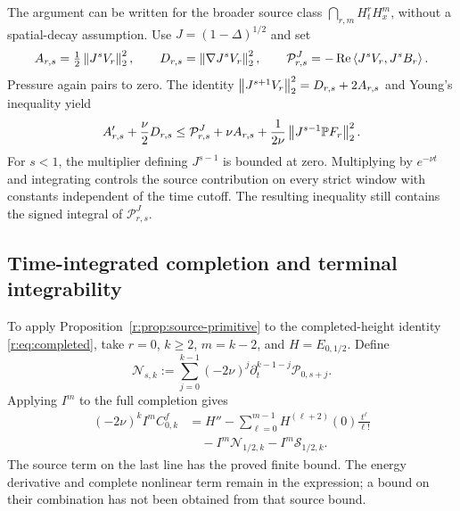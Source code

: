 The argument can be written for the broader source class
\(\bigcap_{r,m}H^r_tH^m_x\), without a spatial-decay assumption.
Use \(J=(1-\Delta)^{1/2}\) and set
\[
 A_{r,s}=\tfrac12\left\lVert J^sV_r\right\rVert_2^2,
 \qquad D_{r,s}=\left\lVert \nabla J^sV_r\right\rVert_2^2,
 \qquad
 \mathcal P^J_{r,s}=-\operatorname{Re}\left\langle J^sV_r,J^sB_r\right\rangle.
\]
Pressure again pairs to zero. The identity
\(\left\lVert J^{s+1}V_r\right\rVert_2^2=D_{r,s}+2A_{r,s}\)
and Young's inequality yield
\begin{equation}
 A'_{r,s}+\frac\nu2D_{r,s}
 \le\mathcal P^J_{r,s}+\nu A_{r,s}
       +\frac1{2\nu}\left\lVert J^{s-1}\mathbb P F_r\right\rVert_2^2.
 \label{r:eq:inhomogeneous-source-absorption}
\end{equation}
For \(s<1\), the multiplier defining \(J^{s-1}\) is bounded at
zero. Multiplying by \(e^{-\nu t}\) and integrating controls the
source contribution on every strict window with constants independent
of the time cutoff. The resulting inequality still contains the
signed integral of \(\mathcal P^J_{r,s}\).





\subsection{Time-integrated completion and terminal integrability}

To apply Proposition~\ref{r:prop:source-primitive} to the
completed-height identity \eqref{r:eq:completed}, take
\(r=0\), \(k\ge2\), \(m=k-2\), and \(H=E_{0,1/2}\). Define
\[
 \mathcal N_{s,k}:=\sum_{j=0}^{k-1}(-2\nu)^j
 \partial_t^{k-1-j}\mathcal P_{0,s+j}.
\]
Applying \(I^m\) to the full completion gives
\begin{equation}
 \begin{aligned}
 (-2\nu)^kI^m C^f_{0,k}
 &=H''-\sum_{\ell=0}^{m-1}H^{(\ell+2)}(0)\frac{t^\ell}{\ell!}\\
 &\quad-I^m\mathcal N_{1/2,k}-I^m\mathcal S_{1/2,k}.
 \end{aligned}
 \label{r:eq:integrated-completion}
\end{equation}
The source term on the last line has the proved finite bound. The energy
derivative and complete nonlinear term remain in the expression; a bound
on their combination has not been obtained from that source bound.

